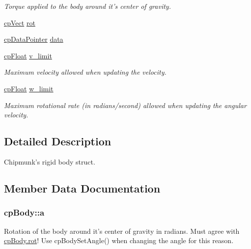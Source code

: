 \begin{DoxyCompactItemize}
\begin{DoxyCompactList}\small\item\em Torque applied to the body around it's center of gravity. \end{DoxyCompactList}\item 
\hyperlink{structcp_vect}{cp\-Vect} \hyperlink{structcp_body_a9ef833e4f67586894e497dbdc7f499ec}{rot}
\item 
\hyperlink{group__basic_types_ga2ac2c3c31e21893941f9e4f8ee279447}{cp\-Data\-Pointer} \hyperlink{structcp_body_a19fd1216b31f6778e90aa42f0a6322d5}{data}
\item 
\hypertarget{structcp_body_a87810a4f61bb8348186a1f300c713ddc}{\hyperlink{group__basic_types_gac1ed65573e035bf892505768c852d8d3}{cp\-Float} \hyperlink{structcp_body_a87810a4f61bb8348186a1f300c713ddc}{v\-\_\-limit}}\label{structcp_body_a87810a4f61bb8348186a1f300c713ddc}

\begin{DoxyCompactList}\small\item\em Maximum velocity allowed when updating the velocity. \end{DoxyCompactList}\item 
\hypertarget{structcp_body_a8d8eef20b9aa0586f5da0af6c332f7e9}{\hyperlink{group__basic_types_gac1ed65573e035bf892505768c852d8d3}{cp\-Float} \hyperlink{structcp_body_a8d8eef20b9aa0586f5da0af6c332f7e9}{w\-\_\-limit}}\label{structcp_body_a8d8eef20b9aa0586f5da0af6c332f7e9}

\begin{DoxyCompactList}\small\item\em Maximum rotational rate (in radians/second) allowed when updating the angular velocity. \end{DoxyCompactList}\end{DoxyCompactItemize}


\subsection{Detailed Description}
Chipmunk's rigid body struct. 

\subsection{Member Data Documentation}
\hypertarget{structcp_body_a93996dfeb1565b8433b7d96773f7300c}{
\subsubsection[{a}]{ {\bf cp\-Body\-::a}}}\label{structcp_body_a93996dfeb1565b8433b7d96773f7300c}
Rotation of the body around it's center of gravity in radians. Must agree with \hyperlink{structcp_body_a9ef833e4f67586894e497dbdc7f499ec}{cp\-Body.\-rot}! Use cp\-Body\-Set\-Angle() when changing the angle for this reason. 

